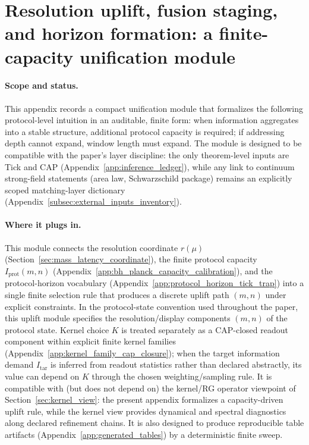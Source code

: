 \section[Resolution uplift and horizon unification]{Resolution uplift, fusion staging, and horizon formation: a finite-capacity unification module}
\label{app:resolution_uplift_fusion_horizon_unification}

\paragraph{Scope and status.}
This appendix records a compact unification module that formalizes the following protocol-level intuition in an auditable, finite form:
when information aggregates into a stable structure, additional protocol capacity is required; if addressing depth cannot expand, window length must expand.
The module is designed to be compatible with the paper's layer discipline:
the only theorem-level inputs are Tick and CAP (Appendix~\ref{app:inference_ledger}),
while any link to continuum strong-field statements (area law, Schwarzschild package) remains an explicitly scoped matching-layer dictionary (Appendix~\ref{subsec:external_inputs_inventory}).

\paragraph{Where it plugs in.}
\InterfaceTag This module connects the resolution coordinate $r(\mu)$ (Section~\ref{sec:mass_latency_coordinate}),
the finite protocol capacity $I_{\mathrm{prot}}(m,n)$ (Appendix~\ref{app:bh_planck_capacity_calibration}),
and the protocol-horizon vocabulary (Appendix~\ref{app:protocol_horizon_tick_trap})
into a single finite selection rule that produces a discrete uplift path $(m,n)$ under explicit constraints.
\AuditTag In the protocol-state convention used throughout the paper, this uplift module specifies the resolution/display components $(m,n)$ of the protocol state.
Kernel choice $K$ is treated separately as a CAP-closed readout component within explicit finite kernel families (Appendix~\ref{app:kernel_family_cap_closure}); when the target information demand $I_{\mathrm{tar}}$ is inferred from readout statistics rather than declared abstractly, its value can depend on $K$ through the chosen weighting/sampling rule.
\InterfaceTag It is compatible with (but does not depend on) the kernel/RG operator viewpoint of Section~\ref{sec:kernel_view}:
the present appendix formalizes a capacity-driven uplift rule, while the kernel view provides dynamical and spectral diagnostics along declared refinement chains.
\AuditTag It is also designed to produce reproducible table artifacts (Appendix~\ref{app:generated_tables}) by a deterministic finite sweep.

